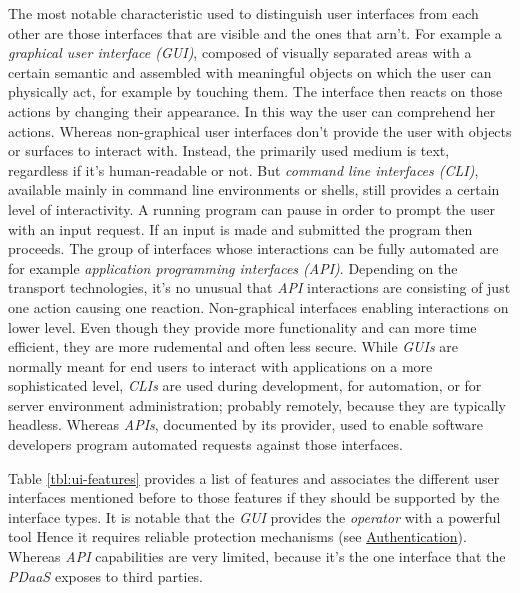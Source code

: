 \documentclass[12pt,english,a4paper,titlepage,cleardoublepage=empty,dottedtoc]{report}
\begin{document}
The most notable characteristic used to distinguish user interfaces from
each other are those interfaces that are visible and the ones that
arn't. For example a \emph{graphical user interface (GUI)}, composed of
visually separated areas with a certain semantic and assembled with
meaningful objects on which the user can physically act, for example by
touching them. The interface then reacts on those actions by changing
their appearance. In this way the user can comprehend her actions.
Whereas non-graphical user interfaces don't provide the user with
objects or surfaces to interact with. Instead, the primarily used medium
is text, regardless if it's human-readable or not. But \emph{command
line interfaces (CLI)}, available mainly in command line environments or
shells, still provides a certain level of interactivity. A running
program can pause in order to prompt the user with an input request. If
an input is made and submitted the program then proceeds. The group of
interfaces whose interactions can be fully automated are for example
\emph{application programming interfaces (API)}. Depending on the
transport technologies, it's no unusual that \emph{API} interactions are
consisting of just one action causing one reaction. Non-graphical
interfaces enabling interactions on lower level. Even though they
provide more functionality and can more time efficient, they are more
rudemental and often less secure. While \emph{GUIs} are normally meant
for end users to interact with applications on a more sophisticated
level, \emph{CLIs} are used during development, for automation, or for
server environment administration; probably remotely, because they are
typically headless. Whereas \emph{APIs}, documented by its provider,
used to enable software developers program automated requests against
those interfaces.

Table \ref{tbl:ui-features} provides a list of features and associates
the different user interfaces mentioned before to those features if they
should be supported by the interface types. It is notable that the
\emph{GUI} provides the \emph{operator} with a powerful tool Hence it
requires reliable protection mechanisms (see
\protect\hyperlink{authentication}{Authentication}). Whereas \emph{API}
capabilities are very limited, because it's the one interface that the
\emph{PDaaS} exposes to third parties.
\end{document}
